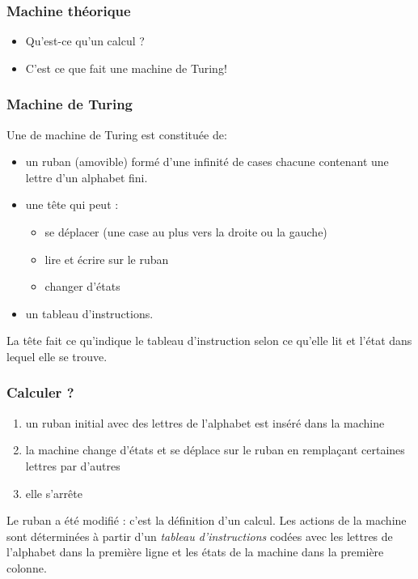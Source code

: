 


\begin{frame}
\frametitle{Machine théorique}
\begin{itemize}
  \item Qu'est-ce qu'un calcul ?
  \pause \item C'est ce que fait une machine de Turing!
\end{itemize}
\end{frame}

\begin{frame}
\frametitle{Machine de Turing}
Une de machine de Turing est constituée de:
\begin{itemize}
  \item un ruban (amovible) formé d'une infinité de cases chacune contenant une lettre d'un alphabet fini.
  \item une tête qui peut :
  \begin{itemize}
    \item se déplacer (une case au plus vers la droite ou la gauche)
    \item lire et écrire sur le ruban
    \item changer d'états
  \end{itemize}
  \item un tableau d'instructions.
\end{itemize}
La tête fait ce qu'indique le tableau d'instruction selon ce qu'elle lit et l'état dans lequel elle se trouve. 
\end{frame}

\begin{frame}
  \frametitle{Calculer ?}
\begin{enumerate}
  \item un ruban initial avec des lettres de l'alphabet est inséré dans la machine
  \item la machine change d'états et se déplace sur le ruban en remplaçant certaines lettres par d'autres
  \item elle s'arrête
\end{enumerate}
Le ruban a été modifié : c'est la définition d'un \og calcul\fg. \newline
Les actions de la machine sont déterminées à partir d'un \emph{tableau d'instructions} codées avec les lettres de l'alphabet dans la première ligne et les états de la machine dans la première colonne.
\end{frame}

